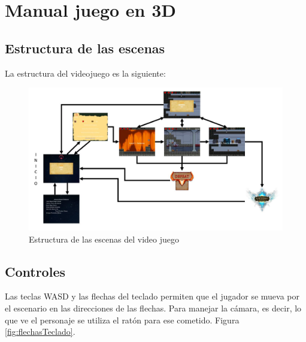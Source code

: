 \chapter{Manual juego en 3D}

\section{Estructura de las escenas}

La estructura del videojuego es la siguiente: 

\begin{figure}[H]
	\centering
	\includegraphics[scale=0.50]{imagenes/Estructura_escena.png}
	\caption{\label{fig:Estructura_escena}Estructura de las escenas del video juego}
\end{figure}

\section{Controles}

Las teclas WASD y las flechas del teclado permiten que el jugador se mueva por el escenario en las direcciones de las flechas. Para manejar la cámara, es decir, lo que ve el personaje se utiliza el ratón para ese cometido. Figura \ref{fig:flechasTeclado}.

